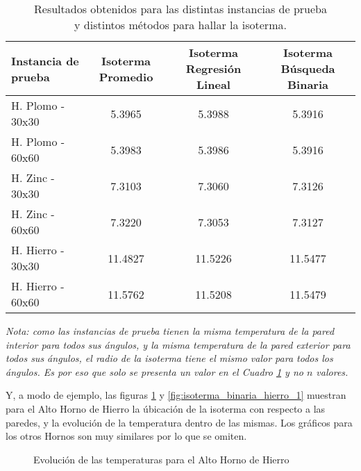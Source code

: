 \begin{table}[H]
    \begin{center}
        \begin{tabular}{| l | c | c | c |}
            \hline
            Instancia de prueba & Isoterma Promedio & Isoterma Regresión Lineal & Isoterma Búsqueda Binaria \\ \hline
            H. Plomo - 30x30    & 5.3965            & 5.3988                    & 5.3916                    \\
            H. Plomo - 60x60    & 5.3983            & 5.3986                    & 5.3916                    \\
            H. Zinc - 30x30     & 7.3103            & 7.3060                    & 7.3126                    \\
            H. Zinc - 60x60     & 7.3220            & 7.3053                    & 7.3127                    \\
            H. Hierro - 30x30   & 11.4827           & 11.5226                   & 11.5477                   \\
            H. Hierro - 60x60   & 11.5762           & 11.5208                   & 11.5479                   \\
            \hline
        \end{tabular}
        \captionsetup{justification=centering}
        \caption{Resultados obtenidos para las distintas instancias de prueba\\ y distintos métodos para hallar la isoterma.}
        \label{tablaisoterma}
    \end{center}
\end{table}
\textit{Nota: como las instancias de prueba tienen la misma temperatura de la pared interior para todos sus ángulos, y la misma temperatura de la pared exterior para todos sus ángulos, el radio de la isoterma tiene el mismo valor para todos los ángulos. Es por eso que solo se presenta un valor en el Cuadro \ref{tablaisoterma} y no $n$ valores.}

\medskip

Y, a modo de ejemplo, las figuras \ref{fig:solucion_hierro_1} y \ref{fig:isoterma_binaria_hierro_1} muestran para el Alto Horno de Hierro la úbicación de la isoterma con respecto a las paredes, y la evolución de la temperatura dentro de las mismas. Los gráficos para los otros Hornos son muy similares por lo que se omiten.

\begin{figure}[H]
    \begin{center}
        \caption{Evolución de las temperaturas para el Alto Horno de Hierro}
        \label{fig:solucion_hierro_1}
    \end{center}
\end{figure}

